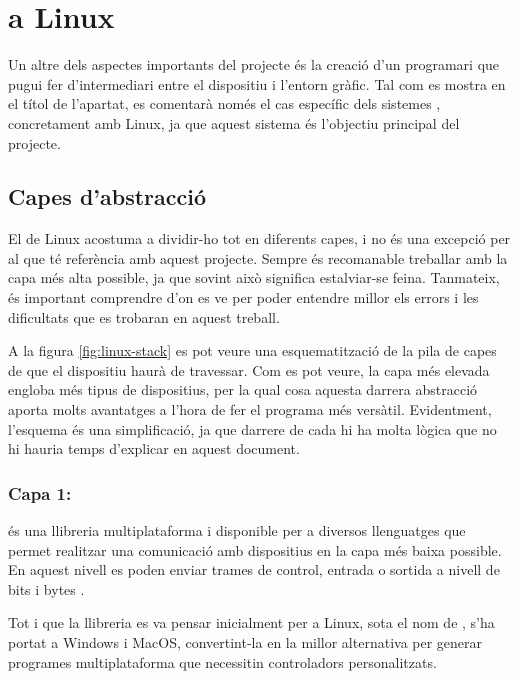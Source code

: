 \section{ a Linux}

Un altre dels aspectes importants del projecte és la creació d'un programari
que pugui fer d'intermediari entre el dispositiu i l'entorn gràfic. Tal com es
mostra en el títol de l'apartat, es comentarà només el cas específic dels sistemes
, concretament amb Linux, ja que aquest sistema és l'objectiu
principal del projecte.

\subsection{Capes d'abstracció}

El  de Linux acostuma a dividir-ho tot en diferents capes, i no és una
excepció per al que té referència amb aquest projecte. Sempre és recomanable
treballar amb la capa més alta possible, ja que sovint això significa
estalviar-se feina. Tanmateix, és important comprendre d'on es ve per
poder entendre millor els errors i les dificultats que es trobaran en aquest treball.

A la figura \ref{fig:linux-stack} es pot veure una esquematització de la pila
de capes de  que el dispositiu haurà de travessar. Com es pot
veure, la capa més elevada engloba més tipus de dispositius, per la qual cosa aquesta
darrera abstracció aporta molts avantatges a l'hora de fer el programa més
versàtil. Evidentment, l'esquema és una simplificació, ja que darrere de cada
 hi ha molta lògica que no hi hauria temps d'explicar en aquest
document.



\subsubsection*{Capa 1: }
\label{subsubsec:libusb}

 és una llibreria multiplataforma i disponible per a diversos
llenguatges que permet realitzar una comunicació amb dispositius  en
la capa més baixa possible. En aquest nivell es poden enviar trames de control,
entrada o sortida a nivell de bits i bytes \cite{Libusb}.

Tot i que la llibreria es va pensar inicialment per a Linux, sota el nom de
 \cite{LinuxUsb}, s'ha portat a Windows i MacOS,
convertint-la en la millor alternativa per generar programes multiplataforma
que necessitin controladors personalitzats.

